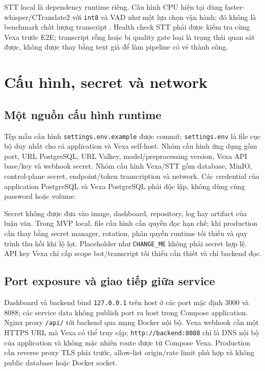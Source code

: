 STT local là dependency runtime riêng. Cấu hình CPU hiện tại dùng faster-whisper/CTranslate2 với \texttt{int8} và VAD như một lựa chọn vận hành; đó không là benchmark chất lượng transcript \cite{fasterwhisper2026}. Health check STT phải được kiểm tra cùng Vexa trước E2E; transcript rỗng hoặc bị quality gate loại là trạng thái quan sát được, không được thay bằng text giả để làm pipeline có vẻ thành công.

\section{Cấu hình, secret và network}
\subsection{Một nguồn cấu hình runtime}
Tệp mẫu cấu hình \texttt{settings.env.\allowbreak example} được commit; \texttt{settings.env} là file cục bộ duy nhất cho cả application và Vexa self-host. Nhóm cấu hình ứng dụng gồm port, URL PostgreSQL, URL Valkey, model/preprocessing version, Vexa API base/key và webhook secret. Nhóm cấu hình Vexa/STT gồm database, MinIO, control-plane secret, endpoint/token transcription và network. Các credential của application PostgreSQL và Vexa PostgreSQL phải độc lập, không dùng cùng password hoặc volume.

Secret không được đưa vào image, dashboard, repository, log hay artifact của luận văn. Trong MVP local, file cấu hình cần quyền đọc hạn chế; khi production cần thay bằng secret manager, rotation, phân quyền runtime tối thiểu và quy trình thu hồi khi lộ lọt. Placeholder như \texttt{CHANGE\_ME} không phải secret hợp lệ. API key Vexa chỉ cấp scope bot/transcript tối thiểu cần thiết và chỉ backend đọc.

\subsection{Port exposure và giao tiếp giữa service}
Dashboard và backend bind \texttt{127.0.0.1} trên host ở các port mặc định 3000 và 8088; các service data không publish port ra host trong Compose application. Nginx proxy \texttt{/api/} tới backend qua mạng Docker nội bộ. Vexa webhook cần một HTTPS URL mà Vexa có thể truy cập; \texttt{http://backend:8088} chỉ là DNS nội bộ của application và không mặc nhiên route được từ Compose Vexa. Production cần reverse proxy TLS phía trước, allow-list origin/rate limit phù hợp và không public database hoặc Docker socket.

